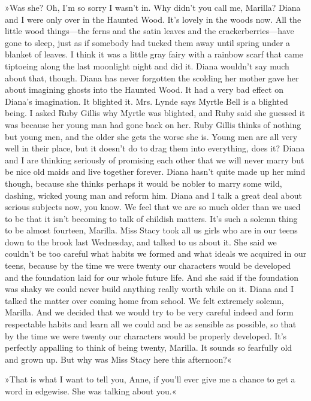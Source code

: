 »Was she? Oh, I'm so sorry I wasn't in. Why didn't you call me, Marilla? Diana and I were only over in the Haunted Wood. It's lovely in the woods now. All the little wood things—the ferns and the satin leaves and the crackerberries—have gone to sleep, just as if somebody had tucked them away until spring under a blanket of leaves. I think it was a little gray fairy with a rainbow scarf that came tiptoeing along the last moonlight night and did it. Diana wouldn't say much about that, though. Diana has never forgotten the scolding her mother gave her about imagining ghosts into the Haunted Wood. It had a very bad effect on Diana's imagination. It blighted it. Mrs. Lynde says Myrtle Bell is a blighted being. I asked Ruby Gillis why Myrtle was blighted, and Ruby said she guessed it was because her young man had gone back on her. Ruby Gillis thinks of nothing but young men, and the older she gets the worse she is. Young men are all very well in their place, but it doesn't do to drag them into everything, does it? Diana and I are thinking seriously of promising each other that we will never marry but be nice old maids and live together forever. Diana hasn't quite made up her mind though, because she thinks perhaps it would be nobler to marry some wild, dashing, wicked young man and reform him. Diana and I talk a great deal about serious subjects now, you know. We feel that we are so much older than we used to be that it isn't becoming to talk of childish matters. It's such a solemn thing to be almost fourteen, Marilla. Miss Stacy took all us girls who are in our teens down to the brook last Wednesday, and talked to us about it. She said we couldn't be too careful what habits we formed and what ideals we acquired in our teens, because by the time we were twenty our characters would be developed and the foundation laid for our whole future life. And she said if the foundation was shaky we could never build anything really worth while on it. Diana and I talked the matter over coming home from school. We felt extremely solemn, Marilla. And we decided that we would try to be very careful indeed and form respectable habits and learn all we could and be as sensible as possible, so that by the time we were twenty our characters would be properly developed. It's perfectly appalling to think of being twenty, Marilla. It sounds so fearfully old and grown up. But why was Miss Stacy here this afternoon?«

»That is what I want to tell you, Anne, if you'll ever give me a chance to get a word in edgewise. She was talking about you.«

